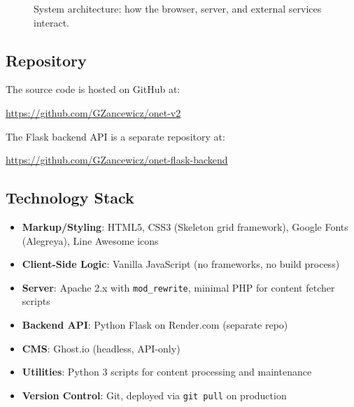 \documentclass[12pt]{article}
\begin{document}
\begin{figure}[ht]
\caption{System architecture: how the browser, server, and external services interact.}
\label{fig:system-arch}
\end{figure}

\subsection{Repository}

The source code is hosted on GitHub at:

\begin{center}
\url{https://github.com/GZancewicz/onet-v2}
\end{center}

The Flask backend API is a separate repository at:

\begin{center}
\url{https://github.com/GZancewicz/onet-flask-backend}
\end{center}

\subsection{Technology Stack}

\begin{itemize}
    \item \textbf{Markup/Styling}: HTML5, CSS3 (Skeleton grid framework), Google Fonts (Alegreya), Line Awesome icons
    \item \textbf{Client-Side Logic}: Vanilla JavaScript (no frameworks, no build process)
    \item \textbf{Server}: Apache 2.x with \texttt{mod\_rewrite}, minimal PHP for content fetcher scripts
    \item \textbf{Backend API}: Python Flask on Render.com (separate repo)
    \item \textbf{CMS}: Ghost.io (headless, API-only)
    \item \textbf{Utilities}: Python 3 scripts for content processing and maintenance
    \item \textbf{Version Control}: Git, deployed via \texttt{git pull} on production
\end{itemize}
\end{document}
